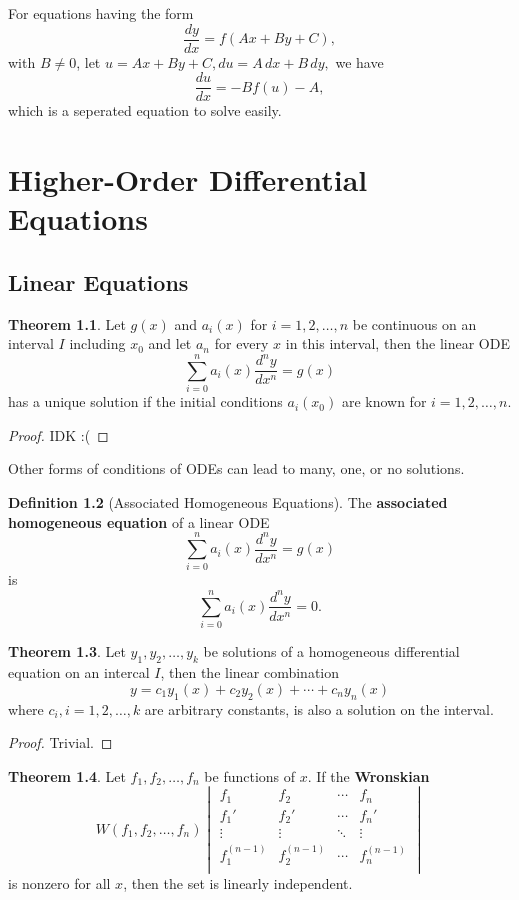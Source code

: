 \documentclass[12pt,a4paper]{report}
\theoremstyle{definition}
\newtheorem{theorem}{Theorem}[section]
\newtheorem{definition}[theorem]{Definition}
\theoremstyle{remark}
\begin{document}
For equations having the form
\[\frac{dy}{dx} = f(Ax + By + C),\]
with $B \neq 0$, let $u = Ax + By + C,du = A\,dx + B\, dy,$ we have
\[\frac{du}{dx} = -Bf(u) - A,\]
which is a seperated equation to solve easily.

\chapter{Higher-Order Differential Equations}

\section{Linear Equations}

\begin{theorem}
    Let $g(x)$ and $a_i(x)$ for $i = 1, 2, \ldots, n$ be continuous on an interval $I$ including $x_0$ and let $a_n$ for every $x$ in this interval, then the linear ODE
    \[\sum_{i = 0}^{n} a_i(x)\frac{d^ny}{dx^n} = g(x)\]
    has a unique solution if the initial conditions $a_i(x_0)$ are known for $i = 1, 2, \ldots, n.$
\end{theorem}
\begin{proof}
    IDK :(
\end{proof}

Other forms of conditions of ODEs can lead to many, one, or no solutions.  

\begin{definition}[Associated Homogeneous Equations]
    The \textbf{associated homogeneous equation} of a linear ODE
    \[\sum_{i = 0}^{n} a_i(x)\frac{d^ny}{dx^n} = g(x)\]
    is
    \[\sum_{i = 0}^{n} a_i(x)\frac{d^ny}{dx^n} = 0.\]
\end{definition}

\begin{theorem}
    Let $y_1, y_2, \ldots, y_k$ be solutions of a homogeneous differential equation on an intercal $I$, then the linear combination
    \[y = c_1y_1(x) + c_2y_2(x) + \cdots + c_ny_n(x)\]
    where $c_i, i = 1, 2, \ldots, k$ are arbitrary constants, is also a solution on the interval.
\end{theorem}

\begin{proof}
    Trivial.
\end{proof}

\begin{theorem}
    Let $f_1, f_2, \ldots, f_n$ be functions of $x$. If the \textbf{Wronskian}
    \[W(f_1, f_2, \ldots, f_n)
    \begin{vmatrix}
        f_1 & f_2 & \cdots & f_n\\
        f_1' & f_2' & \cdots & f_n'\\
        \vdots & \vdots & \ddots & \vdots\\
        f_1^{(n - 1)} & f_2^{(n - 1)} & \cdots & f_n^{(n - 1)}\\
    \end{vmatrix}
    \]
    is nonzero for all $x$, then the set is linearly independent.
\end{theorem}
\end{document}
